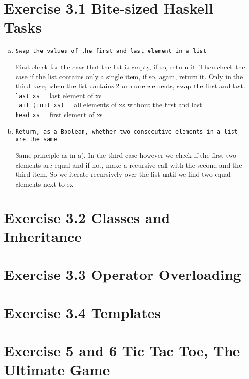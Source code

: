 \documentclass{article} %
\newcommand{\homeworkNumber}{3} %
\begin{document}
\section*{Exercise \homeworkNumber.1 Bite-sized Haskell Tasks}
\begin{enumerate}[a)]
\item \verb|Swap the values of the first and last element in a list|\\
\lstset{language=Haskell}


First check for the case that the list is empty, if so, return it. Then check the case if the list contains only a single item, if so, again, return it. Only in the third case, when the list contains 2 or more elements, swap the first and last.\\
\verb|last xs| = last element of xs\\
\verb|tail (init xs)| = all elements of xs without the first and last\\
\verb|head xs| = first element of xs \\

\item \verb|Return, as a Boolean, whether two consecutive elements in a list are the same|\\
\lstset{language=Haskell}


Same principle as in a). In the third case however we check if the first two elements are equal and if not, make a recursive call with the second and the third item. So we iterate recursively over the list until we find two equal elements next to ex
\end{enumerate}
\clearpage


\section*{Exercise \homeworkNumber.2 Classes and Inheritance}


\clearpage
\section*{Exercise \homeworkNumber.3 Operator Overloading}

\clearpage

\section*{Exercise \homeworkNumber.4 Templates}

%
\clearpage

\section*{Exercise 5 and 6 Tic Tac Toe, The Ultimate Game}
\end{document}
